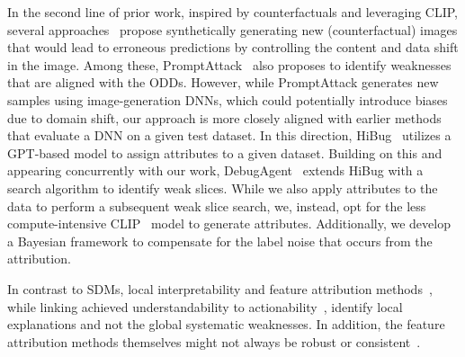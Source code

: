 In the second line of prior work, inspired by counterfactuals and leveraging CLIP, several approaches~\citep{wiles2022discovering, Metzen_2023_ICCV} propose synthetically generating new (counterfactual) images that would lead to erroneous predictions by controlling the content and data shift in the image.
Among these, PromptAttack~\citep{Metzen_2023_ICCV} also proposes to identify weaknesses that are aligned with the ODDs. However, while PromptAttack generates new samples using image-generation DNNs, which could potentially introduce biases due to domain shift, our approach is more closely aligned with earlier methods that evaluate a DNN on a given test dataset.
In this direction, HiBug~\citep{NEURIPS2023_0f53ecc0} utilizes a GPT-based model to assign attributes to a given dataset. Building on this and appearing concurrently with our work, DebugAgent~\citep{chen2025debugagent} extends HiBug with a search algorithm to identify weak slices. While we also apply attributes to the data to perform a subsequent weak slice search, we, instead, opt for the less compute-intensive CLIP~\cite{radford2021learning} model to generate attributes. Additionally, we develop a Bayesian framework to compensate for the label noise that occurs from the attribution.



In contrast to SDMs, local interpretability and feature attribution methods~\citep{ribeiro2016should, lundberg2017unified}, while linking achieved understandability to actionability~\citep{guidotti2022stable}, identify local explanations and not the global systematic weaknesses. In addition, the feature attribution methods themselves might not always be robust or consistent~\citep{krishna2022disagreement}. 

 